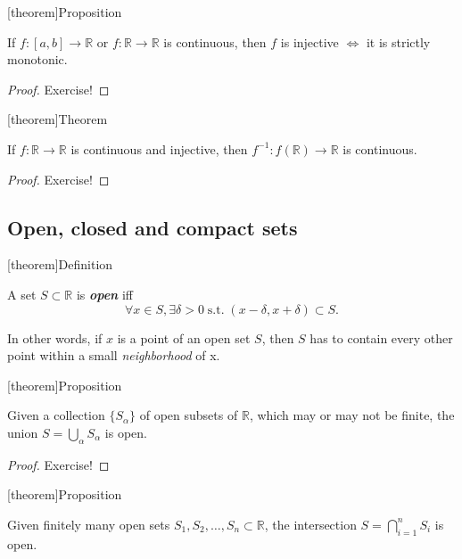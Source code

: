\documentclass[12pt]{report}
\theoremstyle{definition}
\begin{document}
[theorem]{Proposition}
\begin{one-to-one continuous map}
    If $f:[a,b]\rightarrow\mathbb{R}$ or $f:\mathbb{R}\rightarrow\mathbb{R}$ is
    continuous, then $f$ is injective $\iff$
    it is strictly monotonic.
\end{one-to-one continuous map}

\begin{proof}
    Exercise!
\end{proof} 

[theorem]{Theorem}
\begin{continuous and injective f from R to R}
    If $f:\mathbb{R}\rightarrow\mathbb{R}$ is continuous and injective, then
    $f^{-1}:f(\mathbb{R})\rightarrow\mathbb{R}$ is continuous.
\end{continuous and injective f from R to R}

\begin{proof}
    Exercise!
\end{proof} 


\subsection{Open, closed and compact sets}

[theorem]{Definition}
\begin{open set}
    A set $S\subset\mathbb{R}$ is \textbf{\emph{open}} iff \[
        \forall x \in S, \exists \delta > 0 \;\text{s.t.}\; 
        (x-\delta, x+\delta) \subset S.
    \]
\end{open set}
In other words, if $x$ is a point of an open set $S$, then $S$ has to contain
every other point within a small \emph{neighborhood} of x.

[theorem]{Proposition}
\begin{union of open sets are open}\label{prop:2}
    Given a collection $\{S_\alpha\}$ of open subsets of $\mathbb{R}$,
    which may or may not be finite,
    the union $S = \bigcup_\alpha S_\alpha$ is open.
\end{union of open sets are open}

\begin{proof}
    Exercise!
\end{proof} 

[theorem]{Proposition}
\begin{intersection of finite open sets are open}\label{prop:3}
    Given finitely many open sets $S_1, S_2,\ldots,S_n\subset\mathbb{R}$,
    the intersection $S=\bigcap_{i=1}^{n}S_i$ is open.
\end{intersection of finite open sets are open}
\end{document}
